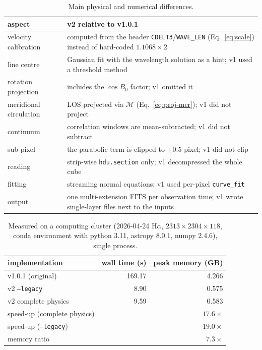 \documentclass[11pt,a4paper]{article}
\newcommand{\code}[1]{\texttt{\small #1}}
\newcommand{\Merid}{\mathcal{M}}
\begin{document}
\begin{table}[htbp]
\centering
\small
\caption{Main physical and numerical differences.}
\begin{tabular}{@{}p{}p{}@{}}
\toprule
aspect & v2 relative to v1.0.1 \\
\midrule
velocity calibration & computed from the header \code{CDELT3}/\code{WAVE\_LEN}
                       (Eq.~\eqref{eq:scale}) instead of hard-coded $1.1068\times2$ \\
line centre & Gaussian fit with the wavelength solution as a hint; v1 used a threshold method \\
rotation projection & includes the $\cos B_0$ factor; v1 omitted it \\
meridional circulation & LOS projected via $\Merid$ (Eq.~\eqref{eq:proj-mer}); v1 did not project \\
continuum & correlation windows are mean-subtracted; v1 did not subtract \\
sub-pixel & the parabolic term is clipped to $\pm0.5$ pixel; v1 did not clip \\
reading & strip-wise \code{hdu.section} only; v1 decompressed the whole cube \\
fitting & streaming normal equations; v1 used per-pixel \code{curve\_fit} \\
output & one multi-extension FITS per observation time; v1 wrote single-layer files next to the inputs \\
\bottomrule
\end{tabular}
\end{table}

\begin{table}[htbp]
\centering
\small
\caption{Measured on a computing cluster (2026-04-24 H$\alpha$,
$2313\times2304\times118$, conda environment with python 3.11, astropy 8.0.1,
numpy 2.4.6), single process.}
\label{tab:speed}
\begin{tabular}{@{}lrr@{}}
\toprule
implementation & wall time (s) & peak memory (GB) \\
\midrule
v1.0.1 (original)          & 169.17 & 4.266 \\
v2 \code{--legacy}         &   8.90 & 0.575 \\
v2 complete physics        &   9.59 & 0.583 \\
\midrule
speed-up (complete physics)& \multicolumn{2}{r}{$17.6\times$} \\
speed-up (\code{--legacy}) & \multicolumn{2}{r}{$19.0\times$} \\
memory ratio               & \multicolumn{2}{r}{$7.3\times$} \\
\bottomrule
\end{tabular}
\end{table}
\end{document}
